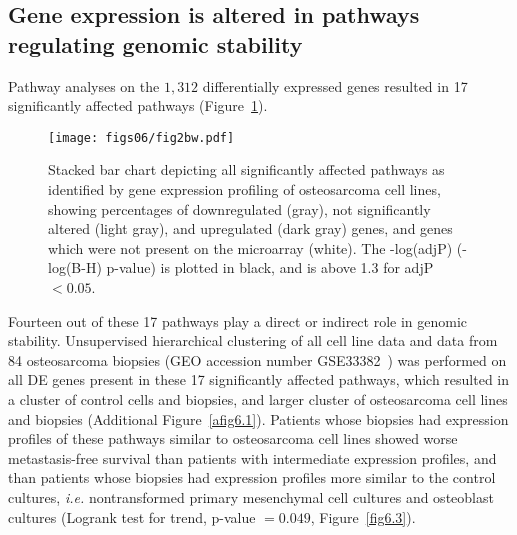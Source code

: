 \subsection{Gene expression is altered in pathways regulating genomic stability}
Pathway analyses on the $1,312$ differentially expressed genes resulted in 17 significantly affected pathways (Figure~\ref{fig6.2}).
%
\begin{figure}[htbp]
	\centering
	\texttt{[image: figs06/fig2bw.pdf]}	%
	\caption{Stacked bar chart depicting all significantly affected pathways as identified by gene expression profiling of osteosarcoma cell lines, showing percentages of downregulated (gray), not significantly altered (light gray), and upregulated (dark gray) genes, and genes which were not present on the microarray (white). The -log(adjP) (-log(B-H) p-value) is plotted in black, and is above 1.3 for adjP $<0.05$.} %
	\label{fig6.2}
\end{figure}
%
Fourteen out of these 17 pathways play a direct or indirect role in genomic stability. Unsupervised hierarchical clustering of all cell line data and data from 84 osteosarcoma biopsies (GEO accession number GSE33382~\cite{kuijjer2012identification}) was performed on all DE genes present in these 17 significantly affected pathways, which resulted in a cluster of control cells and biopsies, and larger cluster of osteosarcoma cell lines and biopsies (Additional Figure~\ref{afig6.1}). Patients whose biopsies had expression profiles of these pathways similar to osteosarcoma cell lines showed worse metastasis\hyp{}free survival than patients with intermediate expression profiles, and than patients whose biopsies had expression profiles more similar to the control cultures, {\it i.e.} nontransformed primary mesenchymal cell cultures and osteoblast cultures (Logrank test for trend, p-value $=0.049$, Figure~\ref{fig6.3}).
%
